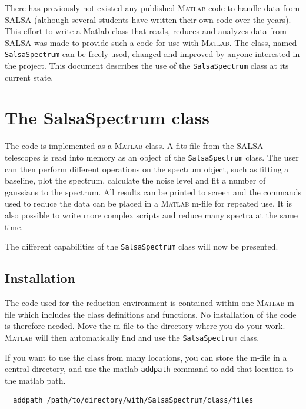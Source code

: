 \documentclass[11pt,a4paper]{article}
\begin{document}
There has previously not existed any published \textsc{Matlab} code to
handle data from SALSA (although several students have written their
own code over the years). This effort to write a Matlab class that
reads, reduces and analyzes data from SALSA was made to provide such a
code for use with \textsc{Matlab}. The class, named
\texttt{SalsaSpectrum} can be freely used, changed and improved by
anyone interested in the project. This document describes the use of
the \texttt{SalsaSpectrum} class at its current state.

\section{The SalsaSpectrum class}
\label{sec:salsaspectrum-class}

The code is implemented as a \textsc{Matlab} class. A fits-file from the SALSA
telescopes is read into memory as an object of the
\texttt{SalsaSpectrum} class. The user can then perform different
operations on the spectrum object, such as fitting a baseline, plot
the spectrum, calculate the noise level and fit a number of
gaussians to the spectrum. All results can be printed to screen and
the commands used to reduce the data can be placed in a \textsc{Matlab} m-file
for repeated use. It is also possible to write more complex scripts
and reduce many spectra at the same time.

The different capabilities of the \texttt{SalsaSpectrum} class will
now be presented.


\subsection{Installation}
\label{sec:installation}

The code used for the reduction environment is contained within one
\textsc{Matlab} m-file which includes the class definitions and functions. No
installation of the code is therefore needed. Move the m-file to the
directory where you do your work. \textsc{Matlab} will then automatically find
and use the \texttt{SalsaSpectrum} class.

If you want to use the class from many locations, you can store the
m-file in a central directory, and use the matlab \texttt{addpath}
command to add that location to the matlab path.

\begin{lstlisting}
  addpath /path/to/directory/with/SalsaSpectrum/class/files
\end{lstlisting}
\end{document}

